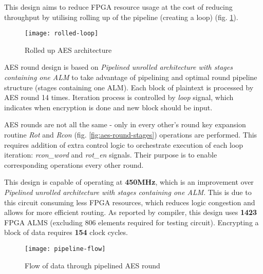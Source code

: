 This design aims to reduce FPGA resource usage at the cost of reducing throughput by utilising rolling up of the pipeline (creating a loop) (fig. \ref{fig:rolled-loop}).

\begin{figure}[!h]
\centering
\texttt{[image: rolled-loop]}
\caption{Rolled up AES architecture}
\label{fig:rolled-loop}
\end{figure}

AES round design is based on \textit{Pipelined unrolled architecture with stages containing one ALM} to take advantage of pipelining and optimal round pipeline structure (stages containing one ALM). Each block of plaintext is processed by AES round 14 times. Iteration process is controlled by \textit{loop} signal, which indicates when encryption is done and new block should be input. 

AES rounds are not all the same - only in every other's round key expansion routine \textit{Rot} and \textit{Rcon} (fig. \ref{fig:aes-round-stages}) operations are performed. This requires addition of extra control logic to orchestrate execution of each loop iteration: \textit{rcon\_word} and \textit{rot\_en} signals. Their purpose is to enable corresponding operations every other round.


This design is capable of operating at \textbf{450MHz}, which is an improvement over \textit{Pipelined unrolled architecture with stages containing one ALM}. This is due to this circuit consuming less FPGA resources, which reduces logic congestion and allows for more efficient routing. As reported by compiler, this design uses \textbf{1423} FPGA ALMS (excluding 806 elements required for testing circuit). Encrypting a block of data requires \textbf{154} clock cycles.

\begin{figure}[!h]
\centering
\texttt{[image: pipeline-flow]}
\caption{Flow of data through pipelined AES round}
\label{fig:pipeline-flow}
\end{figure}

